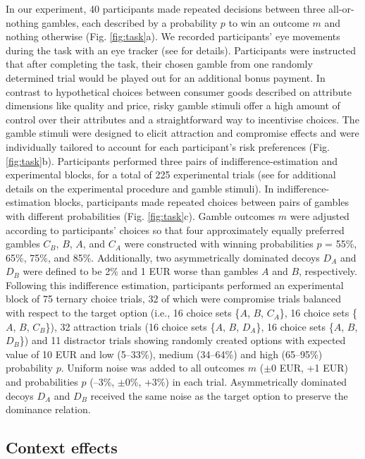 \documentclass[11pt, a4paper]{article}
\begin{document}
In our experiment, 40 participants made repeated decisions between three all-or-nothing gambles, each described by a probability $p$ to win an outcome $m$ and nothing otherwise (Fig. \ref{fig:task}a). We recorded participants' eye movements during the task with an eye tracker (see  for details). Participants were instructed that after completing the task, their chosen gamble from one randomly determined trial would be played out for an additional bonus payment. In contrast to hypothetical choices between consumer goods described on attribute dimensions like quality and price, risky gamble stimuli offer a high amount of control over their attributes and a straightforward way to incentivise choices. The gamble stimuli were designed to elicit attraction and compromise effects and were individually tailored to account for each participant's risk preferences (Fig. \ref{fig:task}b). Participants performed three pairs of indifference-estimation and experimental blocks, for a total of 225 experimental trials (see  for additional details on the experimental procedure and gamble stimuli). In indifference-estimation blocks, participants made repeated choices between pairs of gambles with different probabilities (Fig. \ref{fig:task}c). Gamble outcomes $m$ were adjusted according to participants' choices so that four approximately equally preferred gambles $C_B$, $B$, $A$, and $C_A$ were constructed with winning probabilities $p$ = 55\%, 65\%, 75\%, and 85\%. Additionally, two asymmetrically dominated decoys $D_A$ and $D_B$ were defined to be 2\% and 1 EUR worse than gambles $A$ and $B$, respectively. Following this indifference estimation, participants performed an experimental block of 75 ternary choice trials, 32 of which were compromise trials balanced with respect to the target option (i.e., 16 choice sets \{$A$, $B$, $C_A$\}, 16 choice sets \{$A$, $B$, $C_B$\}), 32 attraction trials (16 choice sets \{$A$, $B$, $D_A$\}, 16 choice sets \{$A$, $B$, $D_B$\}) and 11 distractor trials showing randomly created options with expected value of 10 EUR and low (5–33\%), medium (34–64\%) and high (65–95\%) probability $p$. Uniform noise was added to all outcomes $m$ ($\pm$0 EUR, +1 EUR) and probabilities $p$ (–3\%, $\pm$0\%, +3\%) in each trial. Asymmetrically dominated decoys $D_A$ and $D_B$ received the same noise as the target option to preserve the dominance relation.

\subsection*{Context effects}
\end{document}
